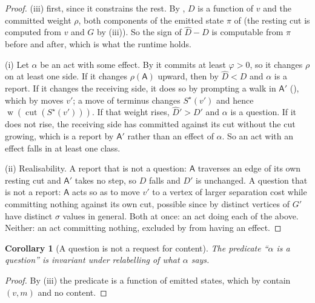 \documentclass[11pt,a4paper]{article}
\theoremstyle{clstyle}
\newtheorem{corollary}[theorem]{Corollary}
\theoremstyle{definition}
\theoremstyle{remark}
\DeclareMathOperator{\wt}{w}
\DeclareMathOperator{\cut}{cut}
\newcommand{\sep}{\sigma}
\newcommand{\Ag}{\mathsf{A}}
\newcommand{\rec}{m}
\newcommand{\term}{v}                    %
\newcommand{\gap}{D}                     %
\begin{document}
\begin{proof}
(iii) first, since it constrains the rest. By , $\gap$ is a
function of $\term$ and the committed weight $\rho$, both components of the
emitted state $\pi$ of  (the resting cut is computed from
$\term$ and $G$ by (iii)). So the sign of
$\widehat{\gap}-\gap$ is computable from $\pi$ before and after, which is
what the runtime holds.

(i) Let $\alpha$ be an act with some effect. By  it
commits at least $\varphi>0$, so it changes $\rho$ on at least one side. If
it changes $\rho(\Ag)$ upward, then by  $\widehat{\gap}<\gap$
and $\alpha$ is a report. If it changes the receiving side, it does so by
prompting a walk in $\Ag'$ (), which by
 moves $\term'$; a move of terminus changes
$S^{\star}(\term')$ and hence $\wt(\cut(S^{\star}(\term')))$. If that weight
rises, $\widehat{\gap}'>\gap'$ and $\alpha$ is a question. If it does not
rise, the receiving side has committed against its cut without the cut
growing, which is a report by $\Ag'$ rather than an effect of $\alpha$. So
an act with an effect falls in at least one class.

(ii) Realisability. A report that is not a question: $\Ag$ traverses an edge
of its own resting cut and $\Ag'$ takes no step, so $\gap$ falls and $\gap'$
is unchanged. A question that is not a report: $\Ag$ acts so as to move
$\term'$ to a vertex of larger separation cost while committing nothing
against its own cut, possible since by  distinct
vertices of $G'$ have distinct $\sep$ values in general. Both at once: an
act doing each of the above. Neither: an act committing nothing, excluded by
 from having an effect.
\end{proof}

\begin{corollary}[A question is not a request for content]
\label{cor:questioncontent}
The predicate ``$\alpha$ is a question'' is invariant under relabelling of
what $\alpha$ says.
\end{corollary}

\begin{proof}
By (iii) the predicate is a function of emitted
states, which by  contain $(\term,\rec)$ and no content.
\end{proof}
\end{document}
